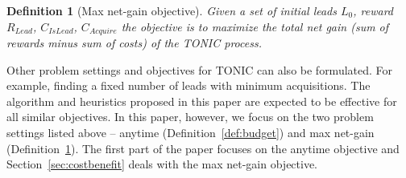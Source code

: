 \documentclass[journal]{IEEEtran}
\newcommand{\islead}[1]{{\em IsLead(#1)}}
\newcommand{\acquire}[1]{{\em Acquire(#1)}}
\newtheorem{definition}{Definition}
\begin{document}
\begin{definition}[Max net-gain objective]
Given a set of initial leads \(L_0\), reward \(R_{Lead}\), $C_{IsLead}$, $C_{Acquire}$ the objective is to maximize the total net gain (sum of rewards minus sum of costs) of the TONIC process.  
\label{def:gain}
\end{definition}



Other problem settings and objectives for TONIC can also be formulated.  For example, finding a fixed number of leads with minimum acquisitions. The algorithm and heuristics proposed in this paper are expected to be effective for all similar objectives. 
In this paper, however, we focus on the two problem settings listed above -- anytime (Definition~\ref{def:budget}) and max net-gain (Definition~\ref{def:gain}). 
The first part of the paper focuses on the anytime objective and Section~\ref{sec:costbenefit} deals with the max net-gain objective. 
\end{document}
